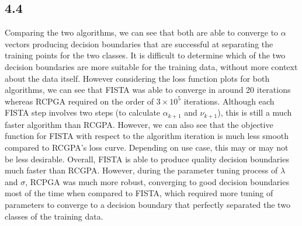 \documentclass[12pt]{article}
\begin{document}
\subsection*{4.4}
Comparing the two algorithms, we can see that both are able to converge to $\alpha$ vectors producing decision boundaries that are successful at separating the training points for the two classes. It is difficult to determine which of the two decision boundaries are more suitable for the training data, without more context about the data itself. However considering the loss function plots for both algorithms, we can see that FISTA was able to converge in around 20 iterations whereas RCPGA required on the order of $3\times 10^{5}$ iterations. Although each FISTA step involves two steps (to calculate $\alpha_{k+1}$ and $\nu_{k+1}$), this is still a much faster algorithm than RCGPA. However, we can also see that the objective function for FISTA with respect to the algorithm iteration is much less smooth compared to RCGPA's loss curve. Depending on use case, this may or may not be less desirable. Overall, FISTA is able to produce quality decision boundaries much faster than RCGPA. However, during the parameter tuning process of $\lambda$ and $\sigma$, RCPGA was much more robust, converging to good decision boundaries most of the time when compared to FISTA, which required more tuning of parameters to converge to a decision boundary that perfectly separated the two classes of the training data.
\end{document}
